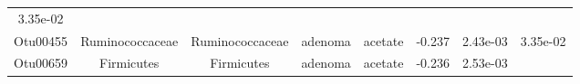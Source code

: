 \documentclass[11pt,]{article}
\begin{document}
\begin{longtable}[]{@{}cccccccc@{}}
\begin{minipage}[t]{0.08\columnwidth}
3.35e-02\strut
\end{minipage}\tabularnewline
\begin{minipage}[t]{0.08\columnwidth}\centering\strut
Otu00455\strut
\end{minipage} & \begin{minipage}[t]{0.15\columnwidth}\centering\strut
Ruminococcaceae\strut
\end{minipage} & \begin{minipage}[t]{0.15\columnwidth}\centering\strut
Ruminococcaceae\strut
\end{minipage} & \begin{minipage}[t]{0.08\columnwidth}\centering\strut
adenoma\strut
\end{minipage} & \begin{minipage}[t]{0.09\columnwidth}\centering\strut
acetate\strut
\end{minipage} & \begin{minipage}[t]{0.07\columnwidth}\centering\strut
-0.237\strut
\end{minipage} & \begin{minipage}[t]{0.08\columnwidth}\centering\strut
2.43e-03\strut
\end{minipage} & \begin{minipage}[t]{0.08\columnwidth}\centering\strut
3.35e-02\strut
\end{minipage}\tabularnewline
\begin{minipage}[t]{0.08\columnwidth}\centering\strut
Otu00659\strut
\end{minipage} & \begin{minipage}[t]{0.15\columnwidth}\centering\strut
Firmicutes\strut
\end{minipage} & \begin{minipage}[t]{0.15\columnwidth}\centering\strut
Firmicutes\strut
\end{minipage} & \begin{minipage}[t]{0.08\columnwidth}\centering\strut
adenoma\strut
\end{minipage} & \begin{minipage}[t]{0.09\columnwidth}\centering\strut
acetate\strut
\end{minipage} & \begin{minipage}[t]{0.07\columnwidth}\centering\strut
-0.236\strut
\end{minipage} & \begin{minipage}[t]{0.08\columnwidth}\centering\strut
2.53e-03\strut
\end{minipage} & \begin{minipage}[t]{0.08\columnwidth}\centering\strut

\end{minipage}
\end{longtable}
\end{document}
